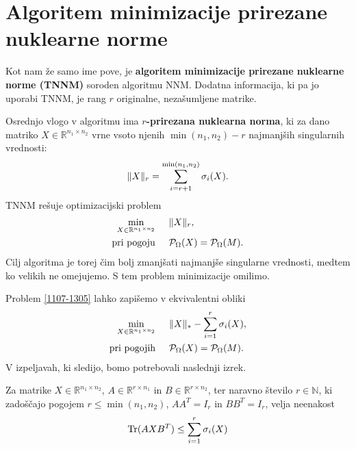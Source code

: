 \section{Algoritem minimizacije prirezane nuklearne norme} \label{2807-1442}
Kot nam že samo ime pove, je \textbf{algoritem minimizacije prirezane nuklearne norme (TNNM)} \cite{TNNM-HZYLH12} soroden algoritmu NNM. Dodatna informacija, ki pa jo uporabi TNNM, je rang $r$ originalne, nezašumljene matrike.

Osrednjo vlogo v algoritmu ima \textbf{$r$-prirezana nuklearna norma}, ki za dano matriko $X \in \mathbb{R}^{n_1 \times n_2}$ vrne vsoto njenih $\min(n_1,n_2) - r$ najmanjših singularnih vrednosti:
\[
    \lVert X\rVert_r = \sum^{\min(n_1, n_2)}_{i = r + 1} \sigma_i(X).
\]
TNNM rešuje optimizacijski problem
\begin{align}
    \label{1107-1305}
    \begin{split}
        \min_{X\in  \mathbb{R}^{n_1 \times n_2}}              & \hspace{0.5cm} \lVert X\rVert_r, \\
        \textrm{pri pogoju} & \hspace{0.5cm} \mathcal{P}_\Omega(X) = \mathcal{P}_\Omega(M).
    \end{split}
\end{align}
Cilj algoritma je torej čim bolj zmanjšati najmanjše singularne vrednosti, medtem ko velikih ne omejujemo. S tem problem minimizacije omilimo.

Problem \eqref{1107-1305} lahko zapišemo v ekvivalentni obliki
\begin{align}
    \label{2507-0835}
    \begin{split}
        \min_{X\in  \mathbb{R}^{n_1 \times n_2}}              & \hspace{0.5cm} \lVert X\rVert_* - \sum_{i=1}^{r} \sigma_i(X), \\
        \textrm{pri pogojih} & \hspace{0.5cm} \mathcal{P}_\Omega(X) = \mathcal{P}_\Omega(M).
    \end{split}
\end{align}
V izpeljavah, ki sledijo, bomo potrebovali naslednji izrek.

\begin{theorem}
    \label{2507-0850}
    Za matrike $X \in \mathbb{R}^{n_1 \times n_2}$, $A \in \mathbb{R}^{r \times n_1}$ in $B \in \mathbb{R}^{r \times n_2}$,
    ter naravno število $r \in \mathbb{N}$, ki zadoščajo pogojem $r \leq \min(n_1, n_2)$, $AA^T = I_{r}$  in $BB^T = I_{r}$, velja neenakost
    \begin{align}
        \label{2507-0836}
        \operatorname{Tr}(AXB^T) \leq \sum_{i=1}^{r} \sigma_i(X)
    \end{align}
\end{theorem}

